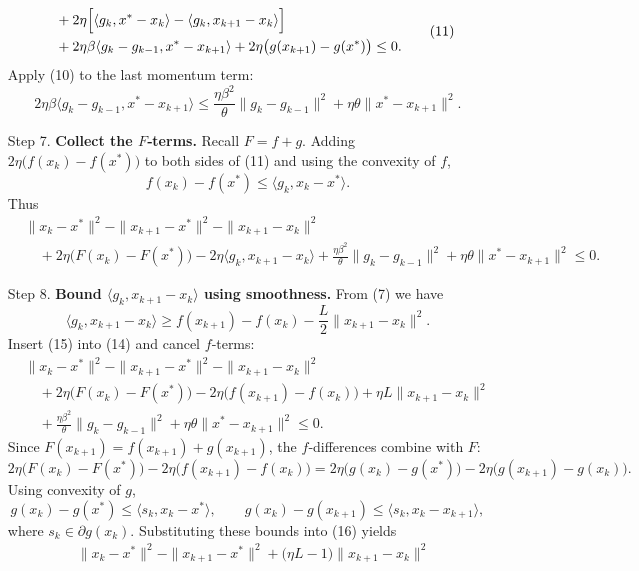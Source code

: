 \documentclass{article}
\begin{document}
\begin{enumerate}
\[\begin{aligned}
&\quad+2\eta\Bigl[\langle g_{k},x^{*}-x_{k}\rangle
   -\langle g_{k},x_{k+1}-x_{k}\rangle\Bigr]\\
&\quad+2\eta\beta\langle g_{k}-g_{k-1},x^{*}-x_{k+1}\rangle
   +2\eta\bigl(g(x_{k+1})-g(x^{*})\bigr)\le 0 .
\end{aligned}
\tag{11}
\]
Apply (10) to the last momentum term:
\[
2\eta\beta\langle g_{k}-g_{k-1},x^{*}-x_{k+1}\rangle
\le
\frac{\eta\beta^{2}}{\theta}\|g_{k}-g_{k-1}\|^{2}
+\eta\theta\|x^{*}-x_{k+1}\|^{2}.
\tag{12}
\]
\item[Step 7.] \textbf{Collect the $F$‑terms.}  
Recall $F= f+g$. Adding $2\eta\bigl(f(x_{k})-f(x^{*})\bigr)$ to both sides of (11) and using the convexity of $f$,
\[
f(x_{k})-f(x^{*})\le\langle g_{k},x_{k}-x^{*}\rangle .
\tag{13}
\]
Thus
\[
\begin{aligned}
&\|x_{k}-x^{*}\|^{2}-\|x_{k+1}-x^{*}\|^{2}
   -\|x_{k+1}-x_{k}\|^{2}\\
&\quad+2\eta\bigl(F(x_{k})-F(x^{*})\bigr)
   -2\eta\langle g_{k},x_{k+1}-x_{k}\rangle
   +\frac{\eta\beta^{2}}{\theta}\|g_{k}-g_{k-1}\|^{2}
   +\eta\theta\|x^{*}-x_{k+1}\|^{2}\le0 .
\end{aligned}
\tag{14}
\]
\item[Step 8.] \textbf{Bound $\langle g_{k},x_{k+1}-x_{k}\rangle$ using smoothness.}  
From (7) we have
\[
\langle g_{k},x_{k+1}-x_{k}\rangle
\ge f(x_{k+1})-f(x_{k})-\frac{L}{2}\|x_{k+1}-x_{k}\|^{2}.
\tag{15}
\]
Insert (15) into (14) and cancel $f$‑terms:
\[
\begin{aligned}
&\|x_{k}-x^{*}\|^{2}-\|x_{k+1}-x^{*}\|^{2}
   -\|x_{k+1}-x_{k}\|^{2}\\
&\quad+2\eta\bigl(F(x_{k})-F(x^{*})\bigr)
   -2\eta\bigl(f(x_{k+1})-f(x_{k})\bigr)
   +\eta L\|x_{k+1}-x_{k}\|^{2}\\
&\quad+\frac{\eta\beta^{2}}{\theta}\|g_{k}-g_{k-1}\|^{2}
   +\eta\theta\|x^{*}-x_{k+1}\|^{2}\le0 .
\end{aligned}
\tag{16}
\]
Since $F(x_{k+1})=f(x_{k+1})+g(x_{k+1})$, the $f$‑differences combine with $F$:
\[
2\eta\bigl(F(x_{k})-F(x^{*})\bigr)-2\eta\bigl(f(x_{k+1})-f(x_{k})\bigr)
=2\eta\bigl(g(x_{k})-g(x^{*})\bigr)-2\eta\bigl(g(x_{k+1})-g(x_{k})\bigr).
\tag{17}
\]
Using convexity of $g$,
\[
g(x_{k})-g(x^{*})\le\langle s_{k},x_{k}-x^{*}\rangle,
\qquad
g(x_{k})-g(x_{k+1})\le\langle s_{k},x_{k}-x_{k+1}\rangle,
\]
where $s_{k}\in\partial g(x_{k})$. Substituting these bounds into (16) yields
\[
\begin{aligned}
&\|x_{k}-x^{*}\|^{2}-\|x_{k+1}-x^{*}\|^{2}
   +\bigl(\eta L-1\bigr)\|x_{k+1}-x_{k}\|^{2}\\

\end{aligned}\]
\end{enumerate}
\end{document}

